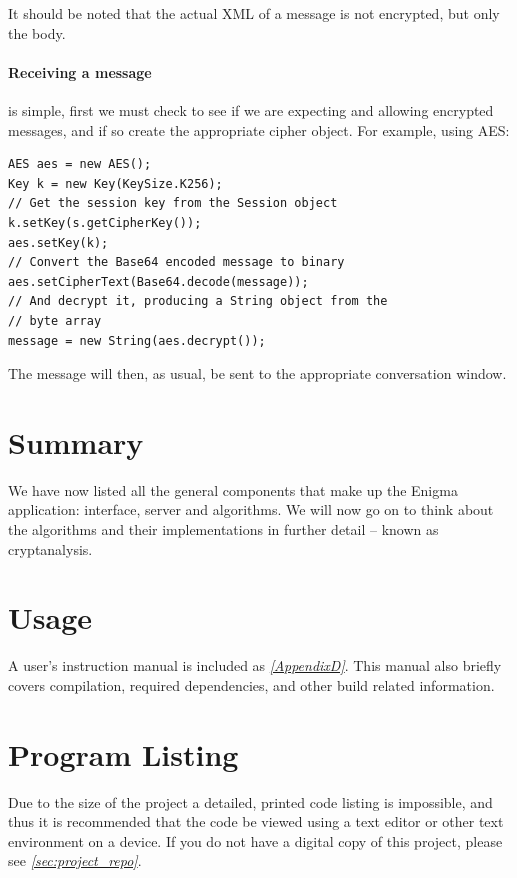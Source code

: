   It should be noted that the actual XML of a message is not encrypted, but only the body.
  
  \paragraph{Receiving a message} is simple, first we must check to see if we are expecting and allowing encrypted messages, and if so create the appropriate cipher object. For example, using AES: \\
  
  \begin{lstlisting}
AES aes = new AES();
Key k = new Key(KeySize.K256);
// Get the session key from the Session object
k.setKey(s.getCipherKey());
aes.setKey(k);
// Convert the Base64 encoded message to binary
aes.setCipherText(Base64.decode(message));
// And decrypt it, producing a String object from the 
// byte array
message = new String(aes.decrypt());
\end{lstlisting}

  The message will then, as usual, be sent to the appropriate conversation window.

\section{Summary}

We have now listed all the general components that make up the Enigma application: interface, server and algorithms. We will now go on to think about the algorithms and their implementations in further detail -- known as cryptanalysis.

\section{Usage}

  A user's instruction manual is included as \emph{\textsection \ref{AppendixD}}. This manual also briefly covers compilation, required dependencies, and other build related information.

\section{Program Listing}

  Due to the size of the project a detailed, printed code listing is impossible, and thus it is recommended that the code be viewed using a text editor or other text environment on a device. If you do not have a digital copy of this project, please see \emph{\textsection \ref{sec:project_repo}}.